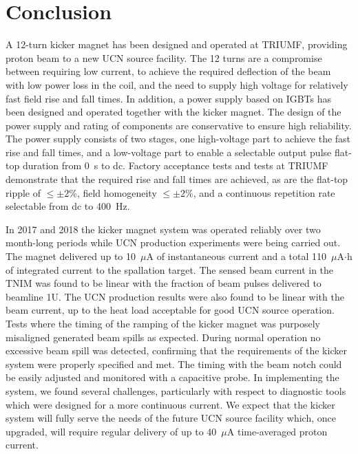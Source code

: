 \documentclass[aps,prab,twocolumn,superscriptaddress]{revtex4-1}
\begin{document}
\section{Conclusion}

A 12-turn kicker magnet has been designed and operated at TRIUMF, providing proton beam to a new UCN source facility. The 12 turns are a compromise between requiring low current, to achieve the required deflection of the beam with low power loss in the coil, and the need to supply high voltage for relatively fast field rise and fall times. In addition, a power supply based on IGBTs has been designed and operated together with the kicker magnet. The design of the power supply and rating of components are conservative to ensure high reliability. The power supply consists of two stages, one high-voltage part to achieve the fast rise and fall times, and a low-voltage part to enable a selectable output pulse flat-top duration from 0~s to dc. Factory acceptance tests and tests at TRIUMF demonstrate that the required rise and fall times are achieved, as are the  flat-top ripple of $\leq \pm 2$\%, field homogeneity $\leq \pm 2$\%, and a continuous repetition rate selectable from dc to 400~Hz.


In 2017 and 2018 the kicker magnet system was operated reliably over two month-long periods while UCN production experiments were being carried out. The magnet delivered up to 10~$\mu$A of instantaneous current and a total 110~$\mu$A$\cdot$h of integrated current to the spallation target.  The sensed beam current in the TNIM was found to be linear with the fraction of beam pulses delivered to beamline 1U. The UCN production results were also found to be linear with the beam current, up to the heat load acceptable for good UCN source operation.  Tests where the timing of the ramping of the kicker magnet was purposely misaligned generated beam spills as expected. During normal operation no excessive beam spill was detected, confirming that the requirements of the kicker system were properly specified and met. The timing with the beam notch could be easily adjusted and monitored with a capacitive probe. In implementing the system, we found several challenges, particularly with respect to diagnostic tools which were designed for a more continuous current.  We expect that the kicker system will fully serve the needs of the future UCN source facility which, once upgraded, will require regular delivery of up to 40~$\mu$A time-averaged proton current.
\end{document}
